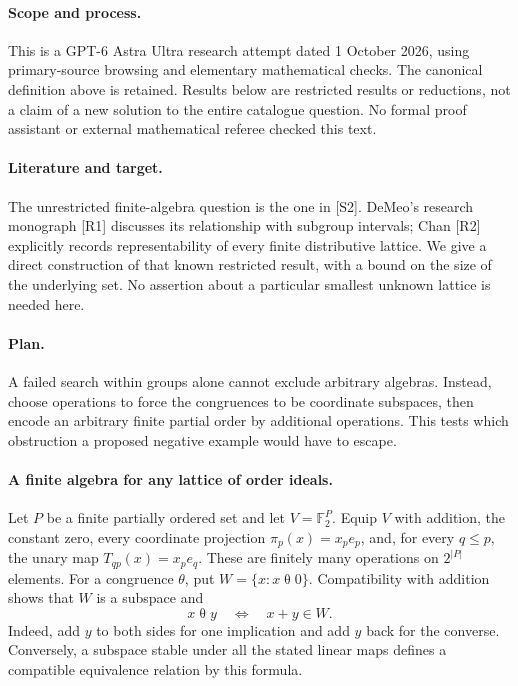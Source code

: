 \documentclass[11pt,a4paper]{article}
\begin{document}
\paragraph{Scope and process.}
This is a GPT-6 Astra Ultra research attempt dated 1 October 2026, using
primary-source browsing and elementary mathematical checks. The canonical
definition above is retained. Results below are restricted results or
reductions, not a claim of a new solution to the entire catalogue question.
No formal proof assistant or external mathematical referee checked this text.


\paragraph{Literature and target.}
The unrestricted finite-algebra question is the one in [S2]. DeMeo's
research monograph [R1] discusses its relationship with subgroup intervals;
Chan [R2] explicitly records representability of every finite distributive
lattice. We give a direct construction of that known restricted result,
with a bound on the size of the underlying set. No assertion about a
particular smallest unknown lattice is needed here.

\paragraph{Plan.}
A failed search within groups alone cannot exclude arbitrary algebras.
Instead, choose operations to force the congruences to be coordinate
subspaces, then encode an arbitrary finite partial order by additional
operations. This tests which obstruction a proposed negative example
would have to escape.

\paragraph{A finite algebra for any lattice of order ideals.}
Let $P$ be a finite partially ordered set and let $V=\mathbb F_2^P$.
Equip $V$ with addition, the constant zero, every coordinate projection
$\pi_p(x)=x_pe_p$, and, for every $q\le p$, the unary map
$T_{qp}(x)=x_pe_q$. These are finitely many operations on $2^{|P|}$
elements. For a congruence $\theta$, put $W=\{x:x\mathrel\theta0\}$.
Compatibility with addition shows that $W$ is a subspace and
\[
 x\mathrel\theta y\quad\Longleftrightarrow\quad x+y\in W.
\]
Indeed, add $y$ to both sides for one implication and add $y$ back for
the converse. Conversely, a subspace stable under all the stated linear
maps defines a compatible equivalence relation by this formula.
\end{document}

